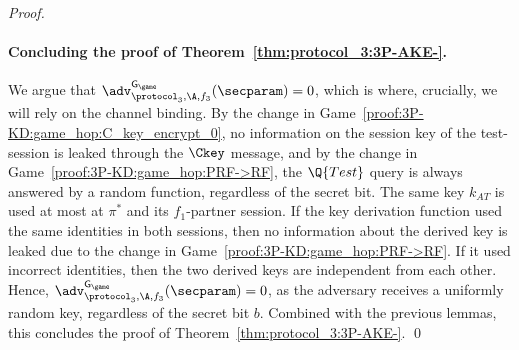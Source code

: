 \begin{proof}
\paragraph{Concluding the proof of Theorem~\ref{thm:protocol_3:3P-AKE-}.}
We argue that $\adv_{\protocol_3,\A,f_3}^{\mathsf{G_\game}}(\secparam)=0$, which is where, crucially, we will rely on the channel binding.
By the change in Game~\ref{proof:3P-KD:game_hop:C_key_encrypt_0}, 
no information on the session key of the test-session is leaked through the $\Ckey$ message,
and by the change in Game~\ref{proof:3P-KD:game_hop:PRF->RF},
the $\Q{Test}$ query is always answered by a random function, regardless of the secret bit.
The same key $k_{AT}$ is used at most at $\pi^*$ and its $f_1$-partner session. If the key
derivation function used the same identities in both sessions, then no information about the derived key
is leaked due to the change in Game~\ref{proof:3P-KD:game_hop:PRF->RF}. If it used incorrect
identities, then the two derived keys are independent from each other. Hence, $\adv_{\protocol_3,\A,f_3}^{\mathsf{G_\game}}(\secparam)=0$,
as the adversary receives a uniformly random key, regardless of the secret bit $b$.
Combined with the previous lemmas, this concludes the proof of Theorem~\ref{thm:protocol_3:3P-AKE-}.
\qed
\end{proof}